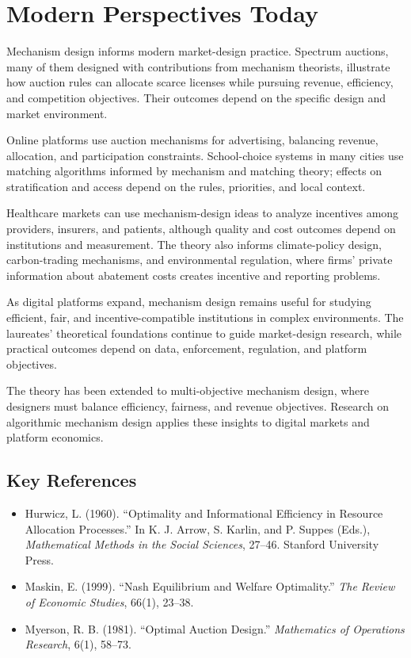 \section{Modern Perspectives Today}
Mechanism design informs modern market-design practice. Spectrum auctions, many
of them designed with contributions from mechanism theorists, illustrate how
auction rules can allocate scarce licenses while pursuing revenue, efficiency,
and competition objectives. Their outcomes depend on the specific design and
market environment.

Online platforms use auction mechanisms for advertising, balancing revenue,
allocation, and participation constraints. School-choice systems in many cities
use matching algorithms informed by mechanism and matching theory; effects on
stratification and access depend on the rules, priorities, and local context.

Healthcare markets can use mechanism-design ideas to analyze incentives among
providers, insurers, and patients, although quality and cost outcomes depend on
institutions and measurement. The theory also informs climate-policy design,
carbon-trading mechanisms, and environmental regulation, where firms' private
information about abatement costs creates incentive and reporting problems.

As digital platforms expand, mechanism design remains useful for studying
efficient, fair, and incentive-compatible institutions in complex environments.
The laureates' theoretical foundations continue to guide market-design research,
while practical outcomes depend on data, enforcement, regulation, and platform
objectives.

The theory has been extended to multi-objective mechanism design, where designers
must balance efficiency, fairness, and revenue objectives. Research on algorithmic
mechanism design applies these insights to digital markets and platform economics.

\subsection*{Key References}
\begin{itemize}
    \item Hurwicz, L. (1960). ``Optimality and Informational Efficiency in Resource Allocation Processes.'' In K. J. Arrow, S. Karlin, and P. Suppes (Eds.), \textit{Mathematical Methods in the Social Sciences}, 27--46. Stanford University Press.
    \item Maskin, E. (1999). ``Nash Equilibrium and Welfare Optimality.'' \textit{The Review of Economic Studies}, 66(1), 23--38.
    \item Myerson, R. B. (1981). ``Optimal Auction Design.'' \textit{Mathematics of Operations Research}, 6(1), 58--73.
\end{itemize}
